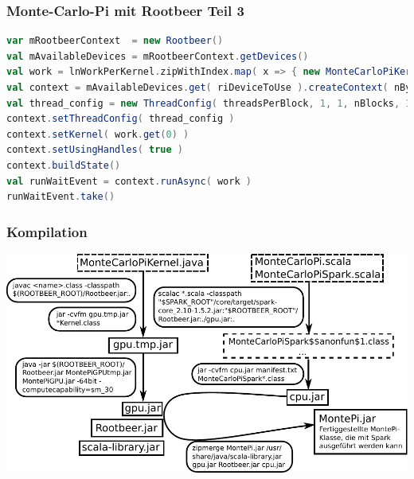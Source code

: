 \begin{frame}[fragile]
    \frametitle{Monte-Carlo-Pi mit Rootbeer Teil 3}
    \begin{lstlisting}[language=scala]
var mRootbeerContext  = new Rootbeer()
val mAvailableDevices = mRootbeerContext.getDevices()
val work = lnWorkPerKernel.zipWithIndex.map( x => { new MonteCarloPiKernel( lnHits(iGpu), lnIterations(iGpu), seed, nIterations ) } )
val context = mAvailableDevices.get( riDeviceToUse ).createContext( nBytesMemoryNeeded )
val thread_config = new ThreadConfig( threadsPerBlock, 1, 1, nBlocks, 1, work.size );
context.setThreadConfig( thread_config )
context.setKernel( work.get(0) )
context.setUsingHandles( true )
context.buildState()
val runWaitEvent = context.runAsync( work )
runWaitEvent.take()
\end{lstlisting}\vspace{-1.5\baselineskip}
\end{frame}

\begin{frame}
    \frametitle{Kompilation}
    \centerline{\includegraphics[width=1.15\linewidth]{compile-structure-deu-new-short.pdf}}
\end{frame}


